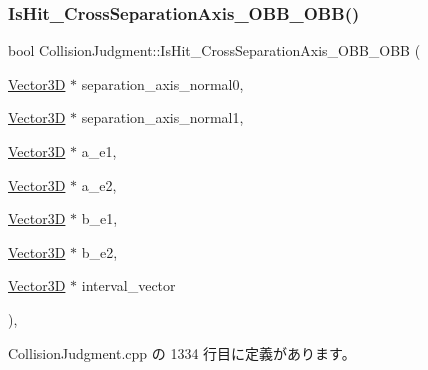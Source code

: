 \subsubsection{\texorpdfstring{Is\+Hit\+\_\+\+Cross\+Separation\+Axis\+\_\+\+O\+B\+B\+\_\+\+O\+B\+B()}{IsHit\_CrossSeparationAxis\_OBB\_OBB()}}
{\footnotesize\ttfamily bool Collision\+Judgment\+::\+Is\+Hit\+\_\+\+Cross\+Separation\+Axis\+\_\+\+O\+B\+B\+\_\+\+O\+BB (\begin{DoxyParamCaption}\item[{\mbox{\hyperlink{class_vector3_d}{Vector3D}} $\ast$}]{separation\+\_\+axis\+\_\+normal0,  }\item[{\mbox{\hyperlink{class_vector3_d}{Vector3D}} $\ast$}]{separation\+\_\+axis\+\_\+normal1,  }\item[{\mbox{\hyperlink{class_vector3_d}{Vector3D}} $\ast$}]{a\+\_\+e1,  }\item[{\mbox{\hyperlink{class_vector3_d}{Vector3D}} $\ast$}]{a\+\_\+e2,  }\item[{\mbox{\hyperlink{class_vector3_d}{Vector3D}} $\ast$}]{b\+\_\+e1,  }\item[{\mbox{\hyperlink{class_vector3_d}{Vector3D}} $\ast$}]{b\+\_\+e2,  }\item[{\mbox{\hyperlink{class_vector3_d}{Vector3D}} $\ast$}]{interval\+\_\+vector }\end{DoxyParamCaption})\hspace{0.3cm}{\ttfamily [static]}, {\ttfamily [private]}}



 Collision\+Judgment.\+cpp の 1334 行目に定義があります。

